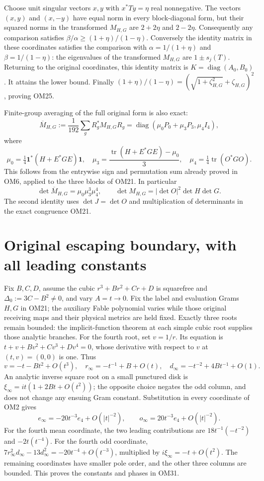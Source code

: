 \documentclass[11pt]{article}
\newcommand{\tr}{\operatorname{tr}}
\newcommand{\diag}{\operatorname{diag}}
\newcommand{\one}{\mathbf 1}
\begin{document}
Choose unit singular vectors $x,y$ with $x^*Ty=\eta$ real
nonnegative.  The vectors $(x,y)$ and $(x,-y)$ have equal
norm in every block-diagonal form, but their squared norms in
the transformed $M_{H,G}$ are $2+2\eta$ and $2-2\eta$.
Consequently any comparison satisfies
$\beta/\alpha\ge(1+\eta)/(1-\eta)$.
Conversely the identity matrix in these coordinates satisfies
the comparison with
$\alpha=1/(1+\eta)$ and $\beta=1/(1-\eta)$:
the eigenvalues of the transformed $M_{H,G}$ are $1\pm s_j(T)$.
Returning to the original coordinates, this identity matrix is
$K=\diag(A_0,B_0)$.  It attains the lower bound.
Finally $(1+\eta)/(1-\eta)=
(\sqrt{1+\zeta_{H,G}^2}+\zeta_{H,G})^2$, proving OM25.

Finite-group averaging of the full original form is also exact:
\[
\overline M_{H,G}
 :=\frac1{192}\sum_gR_g^*M_{H,G}R_g
 =\diag(\mu_0P_0+\mu_3P_3,\mu_4I_4),
\tag{OM27}
\]
where
\[
\mu_0=\tfrac14\one^*(H+E^*GE)\one,\quad
\mu_3=\frac{\tr(H+E^*GE)-\mu_0}{3},\quad
\mu_4=\tfrac14\tr(O^*GO).
\tag{OM28}
\]
This follows from the entrywise sign and permutation sum already
proved in OM6, applied to the three blocks of OM21.  In particular
\[
\det\overline M_{H,G}=\mu_0\mu_3^3\mu_4^4,\qquad
\det M_{H,G}=|\det O|^2\det H\det G.
\tag{OM29}
\]
The second identity uses $\det J=\det O$ and multiplication of
determinants in the exact congruence OM21.

\section{Original escaping boundary, with all leading constants}
Fix $B,C,D$, assume the cubic $r^3+Br^2+Cr+D$ is squarefree
and $\Delta_0:=3C-B^2\ne0$, and vary $A=t\to0$.
Fix the label and evaluation Grams $H,G$ in OM21; the auxiliary
Fable polynomial varies while those original receiving maps
and their physical metrics are held fixed.
Exactly three roots remain bounded: the implicit-function theorem
at each simple cubic root supplies those analytic branches.
For the fourth root, set $v=1/r$.  Its equation is
$t+v+Bv^2+Cv^3+Dv^4=0$, whose derivative with respect to $v$
at $(t,v)=(0,0)$ is one.  Thus
\[
v=-t-Bt^2+O(t^3),\quad
r_\infty=-t^{-1}+B+O(t),\quad
d_\infty=-t^{-2}+4Bt^{-1}+O(1).
\tag{OM30}
\]
An analytic inverse square root on a small punctured disk is
$\xi_\infty=it(1+2Bt+O(t^2))$; the opposite choice negates
the odd column, and does not change any ensuing Gram constant.
Substitution in every coordinate of OM2 gives
\[
e_\infty=-20t^{-3}e_4+O(|t|^{-2}),\qquad
o_\infty=20t^{-3}e_4+O(|t|^{-2}).
\tag{OM31}
\]
For the fourth mean coordinate, the two leading contributions
are $18t^{-1}(-t^{-2})$ and $-2t(t^{-4})$.
For the fourth odd coordinate, $7r_\infty^2d_\infty-
13d_\infty^2=-20t^{-4}+O(t^{-3})$, multiplied by
$i\xi_\infty=-t+O(t^2)$.  The remaining coordinates have
smaller pole order, and the other three columns are bounded.
This proves the constants and phases in OM31.
\end{document}
